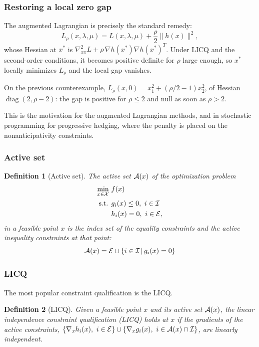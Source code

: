 \documentclass[usepdftitle=false,aspectratio=169]{beamer}
\newtheorem{defn}{Definition}
\def\red{\color{red}}
\begin{document}
\begin{frame}
\frametitle{Restoring a local zero gap}

The {\red augmented Lagrangian} is precisely the standard remedy:
$$
L_{\rho}(x, \lambda, \mu) = L(x, \lambda, \mu) + \frac{\rho}{2}\|h(x)\|^2,
$$
whose Hessian at $x^*$ is $\nabla^2_{xx}L + \rho\, \nabla h(x^*)\nabla h(x^*)^T$.
Under LICQ and the second-order conditions, it becomes positive definite for $\rho$ large enough, so $x^*$ locally minimizes $L_{\rho}$ and the local gap vanishes.

\mbox{}

On the previous counterexample, $L_{\rho}(x, 0) = x_1^2 + (\rho/2 - 1)x_2^2$, of Hessian $\operatorname{diag}(2, \rho-2)$: the gap is positive for $\rho \leq 2$ and null as soon as $\rho > 2$.

\mbox{}

This is the motivation for the augmented Lagrangian methods, and in stochastic programming for {\red progressive hedging}, where the penalty is placed on the nonanticipativity constraints.

\end{frame}

\begin{frame}
\frametitle{Active set}

\begin{defn}[Active set]
The active set ${\mathcal{A}}(x)$ of the optimization problem
\begin{align*}
\min_{x \in {\mathcal{X}}} \ & f(x) \\
\mbox{s.t. } & g_i(x) \leq 0,\ i \in {\mathcal{I}} \\
& h_i(x) = 0,\ i \in {\mathcal{E}},
\end{align*}
in a feasible point $x$ is the index set of the equality constraints and the active inequality constraints at that point:
$$
{\mathcal{A}}(x) = {\mathcal{E}} \cup \lbrace i \in {\mathcal{I}} \,|\, g_i(x) = 0 \rbrace
$$
\end{defn}

\end{frame}

\begin{frame}
\frametitle{LICQ}

The most popular constraint qualification is the LICQ.

\begin{defn}[LICQ]
Given a feasible point $x$ and its active set ${\mathcal{A}}(x)$, the linear independence constraint qualification (LICQ) holds at $x$ if the gradients of the active constraints, $\lbrace \nabla_x h_i(x),\ i \in {\mathcal{E}} \rbrace \cup \lbrace \nabla_x g_i(x),\ i \in {\mathcal{A}}(x) \cap {\mathcal{I}} \rbrace$, are linearly independent.
\end{defn}

\end{frame}
\end{document}
